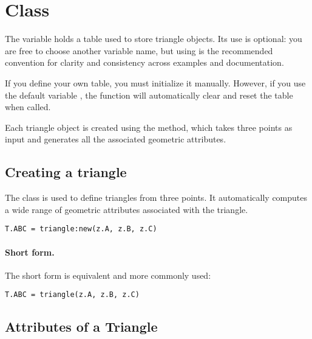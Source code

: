 \newpage
\section{Class } %


The variable  holds a table used to store triangle objects. Its use is optional: you are free to choose another variable name, but using   is the recommended convention for clarity and consistency across examples and documentation.

\medskip
\noindent
If you define your own table, you must initialize it manually. However, if you use the default variable  , the  function will automatically clear and reset the   table when called.

\medskip
\noindent
Each triangle object is created using the  method, which takes three points as input and generates all the associated geometric attributes.

\vspace{1em}

\subsection{Creating a triangle}
\label{sub:creating_a_triangle}

The  class is used to define triangles from three points. It automatically computes a wide range of geometric attributes associated with the triangle.

\begin{mybox}
\begin{verbatim}
T.ABC = triangle:new(z.A, z.B, z.C)
\end{verbatim}
\end{mybox}

\paragraph{Short form.}
The short form  is equivalent and more commonly used:

\begin{mybox}
\begin{verbatim}
T.ABC = triangle(z.A, z.B, z.C)
\end{verbatim}
\end{mybox}

\subsection{Attributes of a Triangle} %

